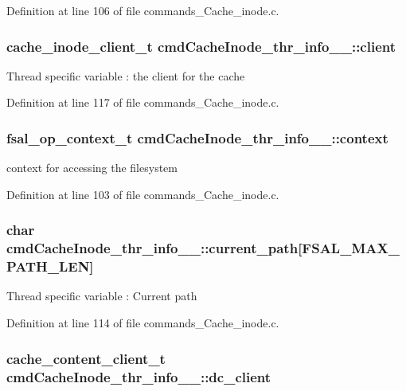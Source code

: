 Definition at line 106 of file commands\_\-Cache\_\-inode.c.
\subsubsection[{client}]{\setlength{\rightskip}{0pt plus 5cm}cache\_\-inode\_\-client\_\-t {\bf cmdCacheInode\_\-thr\_\-info\_\-\_\-::client}}\label{structcmdCacheInode__thr__info_____a4381d3125d193f2d065276612d86346a}
Thread specific variable : the client for the cache 

Definition at line 117 of file commands\_\-Cache\_\-inode.c.
\subsubsection[{context}]{\setlength{\rightskip}{0pt plus 5cm}fsal\_\-op\_\-context\_\-t {\bf cmdCacheInode\_\-thr\_\-info\_\-\_\-::context}}\label{structcmdCacheInode__thr__info_____ae86fa9145c15ef4818e7bf8a1669960b}
context for accessing the filesystem 

Definition at line 103 of file commands\_\-Cache\_\-inode.c.
\subsubsection[{current\_\-path}]{\setlength{\rightskip}{0pt plus 5cm}char {\bf cmdCacheInode\_\-thr\_\-info\_\-\_\-::current\_\-path}[FSAL\_\-MAX\_\-PATH\_\-LEN]}\label{structcmdCacheInode__thr__info_____a86a2ee4d04743a3019167b2d5b611c90}
Thread specific variable : Current path 

Definition at line 114 of file commands\_\-Cache\_\-inode.c.
\subsubsection[{dc\_\-client}]{\setlength{\rightskip}{0pt plus 5cm}cache\_\-content\_\-client\_\-t {\bf cmdCacheInode\_\-thr\_\-info\_\-\_\-::dc\_\-client}}\label{structcmdCacheInode__thr__info_____ad2310c9982c1c46a2ef848e2737cd577}


